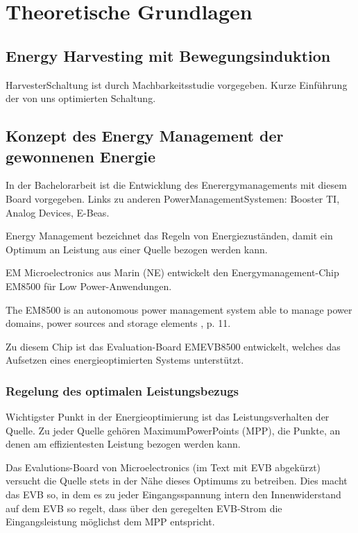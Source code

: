 \chapter{Theoretische Grundlagen}

\section{Energy Harvesting mit Bewegungsinduktion}
HarvesterSchaltung ist durch Machbarkeitsstudie vorgegeben.
Kurze Einführung der von uns optimierten Schaltung. 





\section{Konzept des Energy Management der gewonnenen Energie}
In der Bachelorarbeit ist die Entwicklung des Enerergymanagements mit diesem Board vorgegeben.
Links zu anderen PowerManagementSystemen: Booster TI, Analog Devices, E-Beas.


Energy Management bezeichnet das Regeln von Energiezuständen, damit ein Optimum an Leistung aus einer Quelle bezogen werden kann.

EM Microelectronics aus Marin (NE) entwickelt den Energymanagement-Chip EM8500 für Low Power-Anwendungen. 

The EM8500 is an autonomous power management system able to manage power domains, power sources and storage elements \cite{datasheet_EM85}, p. 11.

Zu diesem Chip ist das Evaluation-Board EMEVB8500 entwickelt, welches das Aufsetzen eines energieoptimierten Systems unterstützt. 


\subsection{Regelung des optimalen Leistungsbezugs}

Wichtigster Punkt in der Energieoptimierung ist das Leistungsverhalten der Quelle. Zu jeder Quelle gehören MaximumPowerPoints (MPP), die Punkte, an denen am effizientesten Leistung bezogen werden kann. 

Das Evalutions-Board von Microelectronics (im Text mit EVB abgekürzt) versucht die Quelle stets in der Nähe dieses Optimums zu betreiben. Dies macht das EVB so, in dem es zu jeder Eingangsspannung intern den Innenwiderstand auf dem EVB so regelt, dass über den geregelten EVB-Strom die Eingangsleistung möglichst dem MPP entspricht.


